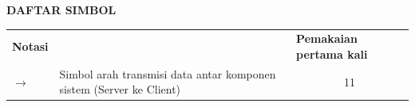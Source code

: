 \cleardoublepage
\vspace{2cm}
\begin{center}
{\fontsize{14}{16.8}\selectfont\textbf{DAFTAR SIMBOL}}\\[1em]
\end{center}
\label{chap:simbol}
\setcounter{chapter}{0}
\setcounter{section}{0}
\vspace{2em}

\begin{longtable}{@{} l >{\raggedright\arraybackslash}p{6.5cm} c @{}}
\multicolumn{1}{l}{\textbf{Notasi}} & \multicolumn{1}{l}{\textbf{Deskripsi}} & \multicolumn{1}{l}{\parbox[c]{3.5cm}{\raggedright \textbf{Pemakaian pertama kali}}} \\


$\rightarrow$ & Simbol arah transmisi data antar komponen sistem (Server ke Client) & 11 \\

\end{longtable}
